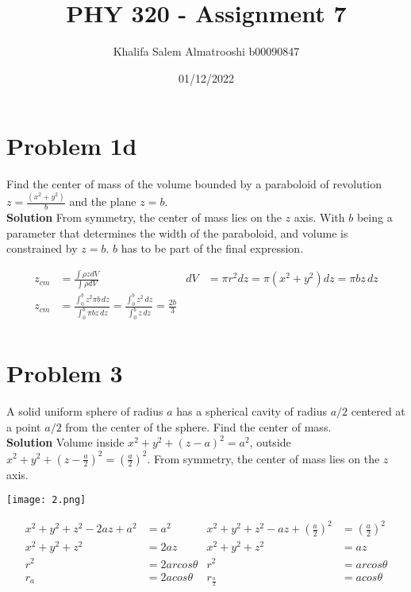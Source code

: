 \documentclass[]{article}
\title{PHY 320 - Assignment 7}
\author{Khalifa Salem Almatrooshi b00090847}
\date{01/12/2022}
\newcommand{\bd}{\textbf}
\begin{document}
	
	\maketitle
	
	\section{Problem 1d}
	
	Find the center of mass of the volume bounded by a paraboloid of revolution $ z = \frac{(x^2 + y^2)}{b} $ and the plane $ z = b $.\\
	
	\bd{Solution} From symmetry, the center of mass lies on the $z$ axis. With $b$ being a parameter that determines the width of the paraboloid, and volume is constrained by $z=b$. $b$ has to be part of the final expression.
	
	\begin{equation}
		\begin{aligned}
			z_{cm} &= \frac{\int \rho z dV}{\int \rho dV} & dV &= \pi r^2 dz = \pi (x^2 + y^2) dz = \pi bz \, dz \\
			z_{cm} &= \frac{\int_{0}^{b} z^2 \pi b \, dz}{\int_{0}^{b} \pi bz \, dz} = \frac{\int_{0}^{b} z^2 \, dz}{\int_{0}^{b} z \, dz} = \frac{2b}{3} \\
		\end{aligned}
	\end{equation}
	
	\section{Problem 3}
	
	A solid uniform sphere of radius $a$ has a spherical cavity of radius $a/2$ centered at a point $a/2$ from the center of the sphere. Find the center of mass. \\
	
	\bd{Solution} Volume inside $x^2 + y^2 + (z - a)^2 = a^2$, outside $x^2 + y^2 + (z - \frac{a}{2})^2 = \left( \frac{a}{2} \right)^2$. From symmetry, the center of mass lies on the $z$ axis.
	
	\begin{center}
		\texttt{[image: 2.png]}
	\end{center}

	\begin{equation}
		\begin{aligned}
			x^2 + y^2 + z^2 - 2az + a^2 &= a^2 & x^2 + y^2 + z^2 - az + \left( \frac{a}{2} \right)^2 &= \left( \frac{a}{2} \right)^2 \\
			x^2 + y^2 + z^2 &= 2az & x^2 + y^2 + z^2 &= az \\
			r^2 &= 2arcos \theta & r^2 &= arcos \theta \\
			r_a &= 2acos \theta & r_{\frac{a}{2}} &= acos \theta \\
		\end{aligned}
	\end{equation}
	
\end{document}
